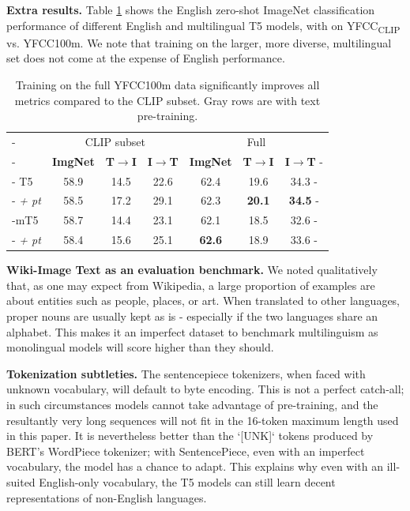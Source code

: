 \textbf{Extra results.}
Table \ref{tab:yfcc_xlang} shows the English zero-shot ImageNet classification performance of different English and multilingual T5 models, with \lit{} on YFCC\textsubscript{CLIP} vs. YFCC100m. We note that training on the larger, more diverse, multilingual set does not come at the expense of English performance.
\begin{table}
\centering
\begin{tabular}{>{\kern-\tabcolsep}lcccccc<{\kern-\tabcolsep}}
\toprule
 & \multicolumn{3}{c}{CLIP subset} & \multicolumn{3}{c}{Full} \\
{} &    \textbf{ImgNet} &   \textbf{T$\rightarrow$I} &   \textbf{I$\rightarrow$T} & \textbf{ImgNet} &   \textbf{T$\rightarrow$I} &   \textbf{I$\rightarrow$T} \\
\midrule
T5 &        58.9 &  14.5 &  22.6 &     62.4 &  19.6 &  34.3 \\
\rowcolor{gray!20} 
\textit{ + pt} &        58.5 &  17.2 &  29.1 &     62.3 &  \textbf{20.1} &  \textbf{34.5} \\
mT5       &        58.7 &  14.4 &  23.1 &     62.1 &  18.5 &  32.6 \\
\rowcolor{gray!20}
\textit{ + pt} &        58.4 &  15.6 &  25.1 &     \textbf{62.6} &  18.9 &  33.6 \\
\bottomrule\end{tabular}
\caption{Training on the full YFCC100m data significantly improves all metrics compared to the CLIP subset. Gray rows are with text pre-training.}
\label{tab:yfcc_xlang}
\end{table}

\textbf{Wiki-Image Text as an evaluation benchmark.} We noted qualitatively that, as one may expect from Wikipedia, a large proportion of examples are about entities such as people, places, or art. When translated to other languages, proper nouns are usually kept as is - especially if the two languages share an alphabet. This makes it an imperfect dataset to benchmark multilinguism as monolingual models will score higher than they should.

\textbf{Tokenization subtleties.} The sentencepiece tokenizers, when faced with unknown vocabulary, will default to byte encoding. This is not a perfect catch-all; in such circumstances models cannot take advantage of pre-training, and the resultantly very long sequences will not fit in the 16-token maximum length used in this paper. It is nevertheless better than the `[UNK]` tokens produced by BERT's WordPiece tokenizer; with SentencePiece, even with an imperfect vocabulary, the model has a chance to adapt. This explains why even with an ill-suited English-only vocabulary, the T5 models can still learn decent representations of non-English languages.

